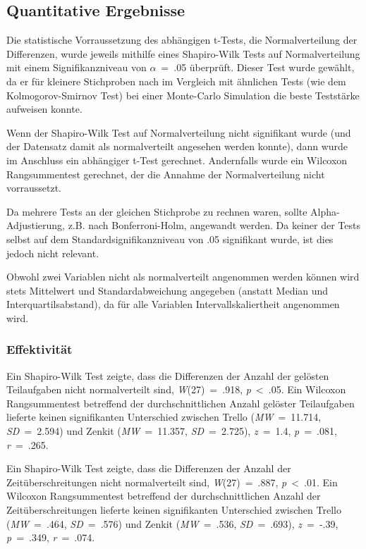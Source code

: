 \subsection{Quantitative Ergebnisse}

Die statistische Vorraussetzung des abhängigen t-Tests, die Normalverteilung der Differenzen, wurde jeweils mithilfe eines Shapiro-Wilk Tests auf Normalverteilung mit einem Signifikanzniveau von $\alpha$~=~.05 überprüft. Dieser Test wurde gewählt, da er für kleinere Stichproben nach \cite{power} im Vergleich mit ähnlichen Tests (wie dem Kolmogorov-Smirnov Test) bei einer Monte-Carlo Simulation die beste Teststärke aufweisen konnte.

Wenn der Shapiro-Wilk Test auf Normalverteilung nicht signifikant wurde (und der Datensatz damit als normalverteilt angesehen werden konnte), dann wurde im Anschluss ein abhängiger t-Test gerechnet. Andernfalls wurde ein Wilcoxon Rangsummentest gerechnet, der die Annahme der Normalverteilung nicht vorraussetzt. 

Da mehrere Tests an der gleichen Stichprobe zu rechnen waren, sollte Alpha-Adjustierung, z.B. nach Bonferroni-Holm, angewandt werden. Da keiner der Tests selbst auf dem Standardsignifikanzniveau von .05 signifikant wurde, ist dies jedoch nicht relevant.

Obwohl zwei Variablen nicht als normalverteilt angenommen werden können wird stets Mittelwert und Standardabweichung angegeben (anstatt Median und Interquartilsabstand), da für alle Variablen Intervallskaliertheit angenommen wird.\\





\subsubsection{Effektivität}
Ein Shapiro-Wilk Test zeigte, dass die Differenzen der Anzahl der gelösten Teilaufgaben nicht normalverteilt sind, \textit{W}(27)~=~.918, \textit{p}~<~.05.
Ein Wilcoxon Rangsummentest betreffend der durchschnittlichen Anzahl gelöster Teilaufgaben lieferte keinen signifikanten Unterschied zwischen Trello (\textit{MW}~=~11.714, \textit{SD}~=~2.594) und Zenkit (\textit{MW}~=~11.357, \textit{SD}~=~2.725), \textit{z}~=~1.4, \textit{p}~=~.081, \textit{r}~=~.265.

Ein Shapiro-Wilk Test zeigte, dass die Differenzen der Anzahl der Zeitüberschreitungen nicht normalverteilt sind, \textit{W}(27)~=~.887, \textit{p}~<~.01.
Ein Wilcoxon Rangsummentest betreffend der durchschnittlichen Anzahl der Zeitüberschreitungen lieferte keinen signifikanten Unterschied zwischen Trello (\textit{MW}~=~.464, \textit{SD}~=~.576) und Zenkit (\textit{MW}~=~.536, \textit{SD}~=~.693), \textit{z}~=~-.39, \textit{p}~=~.349, \textit{r}~=~.074.




